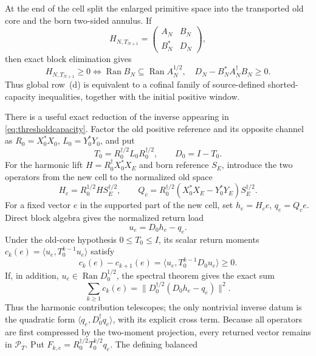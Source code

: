 \documentclass[11pt]{amsart}
\theoremstyle{definition}
\theoremstyle{remark}
\begin{document}
At the end of the cell split the enlarged primitive space into the
transported old core and the born two-sided annulus.  If
\[
 H_{N,T_{N+1}}=\begin{pmatrix}A_N&B_N\\B_N^*&D_N\end{pmatrix},
\]
then exact block elimination gives
\begin{equation}\label{eq:thresholdcapacity}
 H_{N,T_{N+1}}\ge0
 \Longleftrightarrow
 \operatorname{Ran}B_N\subseteq\operatorname{Ran}A_N^{1/2},
 \quad D_N-B_N^*A_N^\dagger B_N\ge0.
\end{equation}
Thus global row~(d) is equivalent to a cofinal family of source-defined
shorted-capacity inequalities, together with the initial positive window.

There is a useful exact reduction of the inverse appearing in
\eqref{eq:thresholdcapacity}.  Factor the old positive reference and its
opposite channel as \(R_0=X_0^*X_0\), \(L_0=Y_0^*Y_0\), and put
\[
 T_0=R_0^{\dagger/2}L_0R_0^{\dagger/2},\qquad D_0=I-T_0.
\]
For the harmonic lift \(H=R_0^\dagger X_0^*X_E\) and born reference
\(S_E\), introduce the two operators from the new cell to the normalized
old space
\[
 H_c=R_0^{1/2}HS_E^{\dagger/2},\qquad
 Q_c=R_0^{\dagger/2}(X_0^*X_E-Y_0^*Y_E)S_E^{\dagger/2}.
\]
For a fixed vector \(e\) in the supported part of the new cell, set
\(h_e=H_ce\), \(q_e=Q_ce\).  Direct block algebra gives the normalized
return load
\begin{equation}\label{eq:returnload}
 u_e=D_0h_e-q_e.
\end{equation}
Under the old-core hypothesis \(0\le T_0\le I\), its scalar return moments
\(c_k(e)=\langle u_e,T_0^{k-1}u_e\rangle\) satisfy
\begin{equation}\label{eq:returntelescoping}
 c_k(e)-c_{k+1}(e)
 =\langle u_e,T_0^{k-1}D_0u_e\rangle\ge0.
\end{equation}
If, in addition, \(u_e\in\operatorname{Ran}D_0^{1/2}\), the spectral
theorem gives the exact sum
\begin{equation}\label{eq:returnsum}
 \sum_{k\ge1}c_k(e)
 =\|D_0^{\dagger/2}(D_0h_e-q_e)\|^2.
\end{equation}
Thus the harmonic contribution telescopes; the only nontrivial inverse
datum is the quadratic form
\(\langle q_e,D_0^\dagger q_e\rangle\), with its explicit cross term.
Because all operators are first compressed by the two-moment projection,
every returned vector remains in \(\mathcal P_T\).  Put
\(F_{k,e}=R_0^{\dagger/2}T_0^{k/2}q_e\).  The defining balanced
\end{document}
